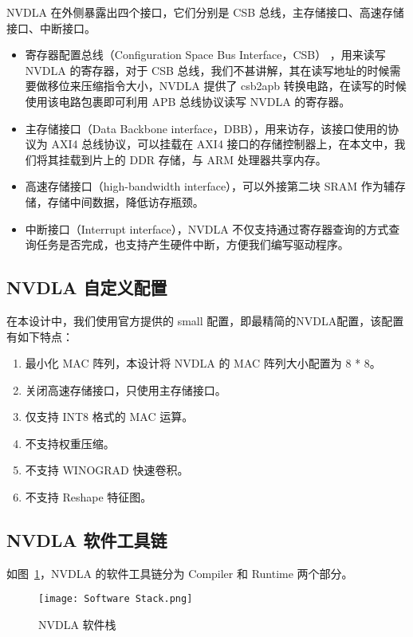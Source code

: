NVDLA 在外侧暴露出四个接口，它们分别是 CSB 总线，主存储接口、高速存储接口、中断接口。

\begin{itemize}
    \item 寄存器配置总线（Configuration Space Bus Interface，CSB） ，用来读写 NVDLA 的寄存器，对于 CSB 总线，我们不甚讲解，其在读写地址的时候需要做移位来压缩指令大小，NVDLA 提供了 csb2apb 转换电路，在读写的时候使用该电路包裹即可利用 APB 总线协议读写 NVDLA 的寄存器。
    \item 主存储接口（Data Backbone interface，DBB），用来访存，该接口使用的协议为 AXI4 总线协议，可以挂载在 AXI4 接口的存储控制器上，在本文中，我们将其挂载到片上的 DDR 存储，与 ARM 处理器共享内存。
    \item 高速存储接口（high-bandwidth interface），可以外接第二块 SRAM 作为辅存储，存储中间数据，降低访存瓶颈。
    \item 中断接口（Interrupt interface），NVDLA 不仅支持通过寄存器查询的方式查询任务是否完成，也支持产生硬件中断，方便我们编写驱动程序。
\end{itemize}

\subsection{NVDLA 自定义配置}

在本设计中，我们使用官方提供的 small 配置，即最精简的NVDLA配置，该配置有如下特点：

\begin{enumerate}
    \item 最小化 MAC 阵列，本设计将 NVDLA 的 MAC 阵列大小配置为 8 * 8。
    \item 关闭高速存储接口，只使用主存储接口。
    \item 仅支持 INT8 格式的 MAC 运算。
    \item 不支持权重压缩。
    \item 不支持 WINOGRAD 快速卷积。
    \item 不支持 Reshape 特征图。
\end{enumerate}

\subsection{NVDLA 软件工具链}

如图~\ref{fig:Software Stack}，NVDLA 的软件工具链分为 Compiler 和 Runtime 两个部分。

\begin{figure}[!htbp]
    \centering
    \texttt{[image: Software Stack.png]}
    \caption{NVDLA 软件栈}
    \label{fig:Software Stack}
\end{figure}

